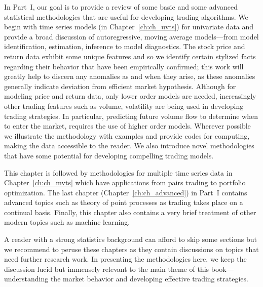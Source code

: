 
In Part~I, our goal is to provide a review of some basic and some advanced statistical methodologies that are useful for developing trading algorithms. We begin with time series models (in Chapter~\ref{ch:ch_uvts}) for univariate data and provide a broad discussion of autoregressive, moving average models---from model identification, estimation, inference to model diagnostics. The stock price and return data exhibit some unique features and so we identify certain stylized facts regarding their behavior that have been empirically confirmed; this work will greatly help to discern any anomalies as and when they arise, as these anomalies generally indicate deviation from efficient market hypothesis. Although for modeling price and return data, only lower order models are needed, increasingly other trading features such as volume, volatility are being used in developing trading strategies. In particular,  predicting future volume flow to determine when to enter the market, requires the use of higher order models. Wherever possible we illustrate the methodology with examples and provide codes for computing, making the data accessible to the reader. We also introduce novel methodologies that have some potential for developing compelling trading models.


This chapter is followed by methodologies for multiple time series data in Chapter~\ref{ch:ch_mvts} which have applications from pairs trading to portfolio optimization. The last chapter (Chapter~\ref{ch:ch_advanced}) in Part~I contains advanced topics such as theory of point processes as trading takes place on a continual basis. Finally, this chapter also contains a very brief treatment of other modern topics such as machine learning.


A reader with a strong statistics background can afford to skip some sections but we recommend to peruse these chapters as they contain discussions on topics that need further research work. In presenting the methodologies here, we keep the discussion lucid but immensely relevant to the main theme of this book---understanding the market behavior and developing effective trading strategies. 